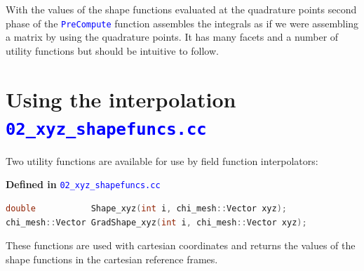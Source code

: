 \documentclass[11pt,letterpaper,titlepage]{article}
\newcommand{\xmltag}[1]{\textcolor{blue}{ \texttt{#1}} }
\begin{document}
\vspace{0.5cm}
With the values of the shape functions evaluated at the quadrature points second phase of the \xmltag{PreCompute} function assembles the integrals as if we were assembling a matrix by using the quadrature points. It has many facets and a number of utility functions but should be intuitive to follow.



\newpage
{}
\section{Using the interpolation \xmltag{02\_xyz\_shapefuncs.cc}}
Two utility functions are available for use by field function interpolators:

\vspace{0.5cm}
\textbf{Defined in } \xmltag{02\_xyz\_shapefuncs.cc}
\begin{lstlisting}[language=c++]
double           Shape_xyz(int i, chi_mesh::Vector xyz);
chi_mesh::Vector GradShape_xyz(int i, chi_mesh::Vector xyz);
\end{lstlisting}

These functions are used with cartesian coordinates and returns the values of the shape functions in the cartesian reference frames.
\end{document}
